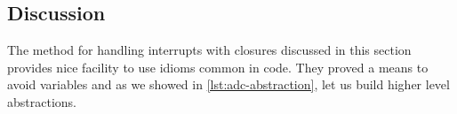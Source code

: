 \subsection{Discussion}

The method for handling interrupts with closures discussed in this section provides nice facility to use idioms common in {\rust} code.
They proved a means to avoid {\unsafe}  variables and as we showed in \autoref{lst:adc-abstraction}, let us build higher level abstractions.





